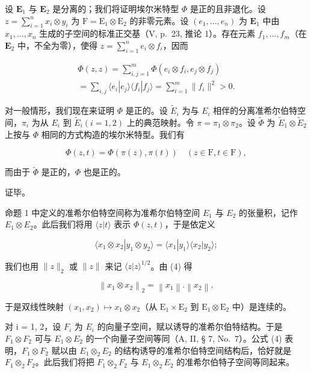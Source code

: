 设 \(\mathbf{E}_1\) 与 \(\mathbf{E}_2\) 是分离的；我们将证明埃尔米特型 \(\Phi\) 是正的且非退化。设 \(z = \sum_{i=1}^{n} x_i \otimes y_i\) 为 \(\mathrm{F} = \mathrm{E}_1 \otimes \mathrm{E}_2\) 的非零元素。设 \((e_1, ..., e_n)\) 为 \(\mathbf{E}_1\) 中由 \(x_1, ..., x_n\) 生成的子空间的标准正交基（V, p.~23, 推论 1）。存在元素 \(f_1, ..., f_m\)（在 \(\mathbf{E}_2\) 中，不全为零），使得 \(z = \sum_{i=1}^{n} e_i \otimes f_i\)，因而

\[
\begin{array}{l} \Phi (z, z) = \sum_ {i, j = 1} ^ {m} \Phi (e _ {i} \otimes f _ {i}, e _ {j} \otimes f _ {j}) \\ = \sum_ {i, j} \langle e _ {i} | e _ {j} \rangle \langle f _ {i} | f _ {j} \rangle = \sum_ {i = 1} ^ {m} \| f _ {i} \| ^ {2} > 0. \end{array}
\]

对一般情形，我们现在来证明 \(\Phi\) 是正的。设 \(\tilde{E}_{i}\) 为与 \(E_{i}\) 相伴的分离准希尔伯特空间，\(\pi_{i}\) 为从 \(E_{i}\) 到 \(\tilde{E}_{i} (i = 1, 2)\) 上的典范映射。令 \(\pi = \pi_{1} \otimes \pi_{2}\)。设 \(\tilde{\Phi}\) 为 \(\tilde{E}_{1} \otimes \tilde{E}_{2}\) 上按与 \(\Phi\) 相同的方式构造的埃尔米特型。我们有

\[
\Phi (z, t) = \Phi (\pi (z), \pi (t)) \quad (z \in \mathrm{F}, t \in \mathrm{F}),
\]

而由于 \(\tilde{\Phi}\) 是正的，\(\Phi\) 也是正的。

证毕。

命题 1 中定义的准希尔伯特空间称为准希尔伯特空间 \(E_{1}\) 与 \(E_{2}\) 的张量积，记作 \(E_{1} \otimes E_{2}\)。此后我们将用 \(\langle z|t\rangle\) 表示 \(\Phi(z,t)\)，于是依定义

\[
\langle x _ {1} \otimes x _ {2} | y _ {1} \otimes y _ {2} \rangle = \langle x _ {1} | y _ {1} \rangle \langle x _ {2} | y _ {2} \rangle ;\tag{4}
\]

我们也用 \(\| z\| _2\) 或 \(\| z\|\) 来记 \(\langle z|z\rangle^{1 / 2}\)。由 (4) 得

\[
\left\| x _ {1} \otimes x _ {2} \right\| _ {2} = \left\| x _ {1} \right\|. \left\| x _ {2} \right\|,\tag{5}
\]

于是双线性映射 \((x_{1}, x_{2}) \mapsto x_{1} \otimes x_{2}\)（从 \(\mathrm{E}_1 \times \mathrm{E}_2\) 到 \(\mathrm{E}_1 \otimes \mathrm{E}_2\) 中）是连续的。

对 i = 1, 2，设 \(F_{i}\) 为 \(E_{i}\) 的向量子空间，赋以诱导的准希尔伯特结构。于是 \(F_{1} \otimes F_{2}\) 可与 \(E_{1} \otimes E_{2}\) 的一个向量子空间等同（A, II, § 7, No.~7）。公式 (4) 表明，\(F_{1} \otimes F_{2}\) 赋以由 \(E_{1} \otimes_{2} E_{2}\) 的结构诱导的准希尔伯特空间结构后，恰好就是 \(F_{1} \otimes_{2} F_{2}\)。此后我们将把 \(F_{1} \otimes_{2} F_{2}\) 与 \(E_{1} \otimes_{2} E_{2}\) 的准希尔伯特子空间等同起来。

